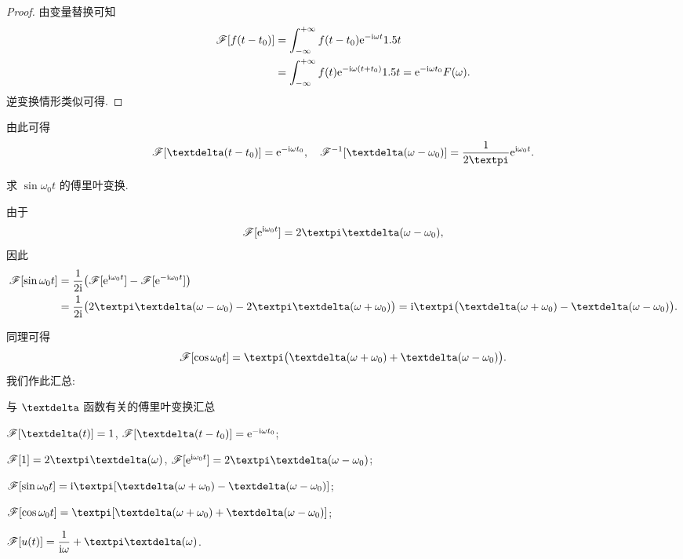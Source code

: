\begin{proof}
  由变量替换可知
  \begin{align*}
    \mathscr{F}[f(t-t_0)]&=\displaystyle\int_{-\infty}^{+\infty} f(t-t_0)\mathrm{e}^{-\mathrm{i} \omega t}1.5 t\\
    &=\displaystyle\int_{-\infty}^{+\infty} f(t)\mathrm{e}^{-\mathrm{i} \omega (t+t_0)}1.5 t=\mathrm{e}^{-\mathrm{i} \omega t_0}F(\omega).
  \end{align*}
  逆变换情形类似可得.
\end{proof}

由此可得
\[
  \msf[\dirac(t-t_0)]=\ee^{-\ii \omega t_0},\quad
  \msf^{-1}[\dirac(\omega-\omega_0)]=\dfrac1{2\cpi}\ee^{\ii \omega_0 t}.
\]

\begin{example}
  求 $\sin{\omega_0 t}$ 的傅里叶变换.
\end{example}

\begin{solution}
  由于
  \[
    \msf[\ee^{\ii \omega_0t}]=2\cpi\dirac(\omega-\omega_0),
  \]
  因此
  \begin{align*}
    \msf[\sin{\omega_0 t}]&=\frac1{2\ii }\bigl(\msf[\ee^{\ii \omega_0t}]-\msf[\ee^{-\ii \omega_0t}]\bigr)\\
    &=\frac1{2\ii }\bigl(2\cpi\dirac(\omega-\omega_0)-2\cpi\dirac(\omega+\omega_0)\bigr)
    =\ii \cpi\bigl(\dirac(\omega+\omega_0)-\dirac(\omega-\omega_0)\bigr).
  \end{align*}
\end{solution}

同理可得
\[
  \msf[\cos{\omega_0 t}]
  =\cpi\bigl(\dirac(\omega+\omega_0)+\dirac(\omega-\omega_0)\bigr).
\]
我们作此汇总:
\begin{fifth}{与 $\dirac$ 函数有关的傅里叶变换汇总}
  \label{page:dirac-fourier-transform}
  \begin{enuma}
    \item $\msf[\dirac(t)]=1$, $\msf[\dirac(t-t_0)]=\ee^{-\ii \omega t_0}$;
    \item $\msf[1]=2\cpi\dirac(\omega)$, $\msf[\ee^{\ii \omega_0 t}]=2\cpi\dirac(\omega-\omega_0)$;
    \item $\msf[\sin \omega_0t]=\ii \cpi[\dirac(\omega+\omega_0)-\dirac(\omega-\omega_0)]$;
    \item $\msf[\cos{\omega_0 t}]=\cpi[\dirac(\omega+\omega_0)+\dirac(\omega-\omega_0)]$;
    \item $\msf[u(t)]=\dfrac1{\ii \omega}+\cpi\dirac(\omega)$.
  \end{enuma}
\end{fifth}







